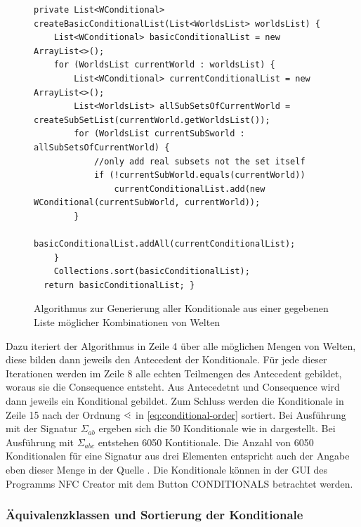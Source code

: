 \documentclass[12pt,a4paper]{article}
\newcommand\dotl{\mathrel{%
    \mathchoice{\QEQ}{\QEQ}{\QEQ}{\QEQ}%
}}
\def\QEQ{{%
    \setbox0\hbox{<}%
    \rlap{\hbox to \wd0{\hss \raisebox {0.1pt}{$\ \cdot$\hss}}}\box0
}}
\begin{document}
\begin{figure}
\begin{lstlisting}
private List<WConditional> createBasicConditionalList(List<WorldsList> worldsList) {
    List<WConditional> basicConditionalList = new ArrayList<>();
    for (WorldsList currentWorld : worldsList) {
        List<WConditional> currentConditionalList = new ArrayList<>();
        List<WorldsList> allSubSetsOfCurrentWorld = createSubSetList(currentWorld.getWorldsList());
        for (WorldsList currentSubSworld : allSubSetsOfCurrentWorld) {
            //only add real subsets not the set itself
            if (!currentSubWorld.equals(currentWorld))
                currentConditionalList.add(new WConditional(currentSubWorld, currentWorld));
        }
        basicConditionalList.addAll(currentConditionalList);
    }
    Collections.sort(basicConditionalList);
  return basicConditionalList; }
\end{lstlisting}
\caption{Algorithmus zur Generierung aller Konditionale aus einer gegebenen Liste möglicher Kombinationen von Welten}
\label{code:create-conditionals}
\end{figure} 


Dazu iteriert der Algorithmus in Zeile 4 über alle möglichen Mengen von Welten, diese bilden dann jeweils den Antecedent der Konditionale. Für jede dieser Iterationen werden im Zeile 8 alle echten Teilmengen des Antecedent gebildet, woraus sie die Consequence entsteht. Aus Antecedetnt und Consequence wird dann jeweils ein Konditional gebildet. Zum Schluss werden die Konditionale in Zeile 15 nach der Ordnung $\dotl$ in \autoref{eq:conditional-order} sortiert. Bei Ausführung mit der Signatur $\Sigma_{ab}$ ergeben sich die 50 Konditionale wie in \cite{beierle19} dargestellt. Bei Ausführung mit $\Sigma_{abc}$ entstehen 6050 Kontitionale. Die Anzahl von 6050 Konditionalen für eine Signatur aus drei Elementen entspricht auch der Angabe eben dieser Menge in  der Quelle \cite{beierle19b}. Die Konditionale können in der GUI des Programms NFC Creator mit dem Button CONDITIONALS betrachtet werden.




\subsubsection{Äquivalenzklassen und Sortierung der Konditionale}
\label{sec:equivalence}
\end{document}
